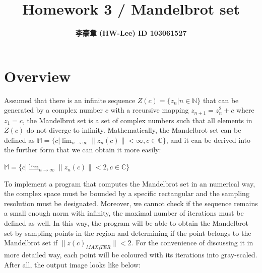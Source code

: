 \documentclass[12pt]{article}
\title{\textbf{ Homework 3 / Mandelbrot set }}
\author{\textbf{李豪韋 (HW-Lee) ID 103061527}}
\date{}
\begin{document}
\vspace*{-60pt}
{\let\newpage\relax\maketitle}
\thispagestyle{title}

\section*{Overview}
\vspace{-20pt}
\noindent\makebox[\linewidth]{\rule{\textwidth}{0.4pt}}
\vspace{5pt}

Assumed that there is an infinite sequence $Z(c) = \{z_n|n \in \mathbb{N}\}$ that can be generated by a complex number $c$ with a recursive mapping $z_{n+1} = z_n^2 + c$ where $z_1 = c$, the Mandelbrot set is a set of complex numbers such that all elements in $Z(c)$ do not diverge to infinity. Mathematically, the Mandelbrot set can be defined as $\mathbb{M} = \{c|\displaystyle\lim_{n \to \infty}\|z_n(c)\| < \infty , c \in \mathbb{C}\}$, and it can be derived into the further form that we can obtain it more easily:
\begin{center}
    $\mathbb{M} = \{c|\displaystyle\lim_{n \to \infty}\|z_n(c)\| < 2 , c \in \mathbb{C}\}$
\end{center}

To implement a program that computes the Mandelbrot set in an numerical way, the complex space must be bounded by a specific rectangular and the sampling resolution must be designated. Moreover, we cannot check if the sequence remains a small enough norm with infinity, the maximal number of iterations must be defined as well. In this way, the program will be able to obtain the Mandelbrot set by sampling points in the region and determining if the point belongs to the Mandelbrot set if $\|z(c)_{MAX_ITER}\| < 2$. For the convenience of discussing it in more detailed way, each point will be coloured with its iterations into gray-scaled. After all, the output image looks like below:
\end{document}
